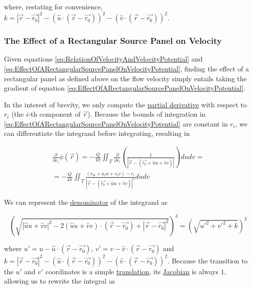 ﻿\documentclass{article}
\begin{document}
where, restating for convenience, $k = |\vec{r} - \vec{r_0}|^2 - (\hat{u} \cdot (\vec{r} - \vec{r_0}))^2 - (\hat{v} \cdot (\vec{r} - \vec{r_0}))^2$.

\subsubsection{The Effect of a Rectangular Source Panel on Velocity}

Given equations \ref{eq:RelationOfVelocityAndVelocityPotential} and \ref{eq:EffectOfARectangularSourcePanelOnVelocityPotential}, finding the effect of a rectangular panel as defined above on the flow velocity simply entails taking the gradient of equation \ref{eq:EffectOfARectangularSourcePanelOnVelocityPotential}.

In the interest of brevity, we only compute the \href{https://en.wikipedia.org/wiki/Partial_derivative}{partial derivative} with respect to $r_i$ (the $i$-th component of $\vec{r}$). Because the bounds of integration in \ref{eq:EffectOfARectangularSourcePanelOnVelocityPotential} are constant in $r_i$, we can differentiate the integrand before integrating, resulting in

\begin{multline*}
    \frac{\partial}{\partial r_i} \phi(\vec{r}) = - \frac{Q}{4 \pi} \iint_T \frac{\partial}{\partial r_i} \left( \frac{1}{|\vec{r} - (\vec{r_0} + \hat{u} u + \hat{v} v)|} \right) du dv = \\
    = - \frac{Q}{4 \pi} \iint_T \frac{(r_{0i} + u_i u + v_i v) - r_i}{|\vec{r} - (\vec{r_0} + \hat{u} u + \hat{v} v)|^3} du dv
\end{multline*}

We can represent the \href{https://en.wikipedia.org/wiki/Fraction}{denominator} of the integrand as

\begin{equation*}
    \left( \sqrt{|\hat{u} u + \hat{v} v|^2 - 2 (\hat{u} u + \hat{v} v) \cdot (\vec{r} - \vec{r_0}) + |\vec{r} - \vec{r_0}|^2} \right)^3 = \left( \sqrt{u'^2 + v'^2 + k} \right)^3
\end{equation*}

where $u' = u - \hat{u} \cdot (\vec{r} - \vec{r_0})$, $v' = v - \hat{v} \cdot (\vec{r} - \vec{r_0})$ and $k = |\vec{r} - \vec{r_0}|^2 - (\hat{u} \cdot (\vec{r} - \vec{r_0}))^2 - (\hat{v} \cdot (\vec{r} - \vec{r_0}))^2$. Because the transition to the $u'$ and $v'$ coordinates is a simple \href{https://en.wikipedia.org/wiki/Translation_(geometry)}{translation}, its \href{https://en.wikipedia.org/wiki/Jacobian_matrix_and_determinant}{Jacobian} is always $1$, allowing us to rewrite the integral as
\end{document}
